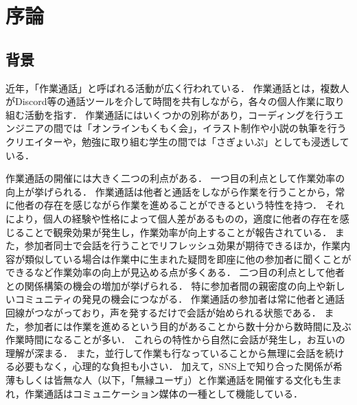 \chapter{序論\label{sec:introduction}}
\thispagestyle{plain}

\section{背景}

近年，「作業通話」と呼ばれる活動が広く行われている．
作業通話とは，複数人がDiscord\cite{Discord}等の通話ツールを介して時間を共有しながら，各々の個人作業に取り組む活動を指す．
作業通話にはいくつかの別称があり，コーディングを行うエンジニアの間では「オンラインもくもく会」，イラスト制作や小説の執筆を行うクリエイターや，勉強に取り組む学生の間では「さぎょいぷ」としても浸透している．

作業通話の開催には大きく二つの利点がある．
一つ目の利点として作業効率の向上が挙げられる．
作業通話は他者と通話をしながら作業を行うことから，常に他者の存在を感じながら作業を進めることができるという特性を持つ．
それにより，個人の経験や性格によって個人差があるものの，適度に他者の存在を感じることで観衆効果が発生し，作業効率が向上することが報告されている\cite{Zajonc}\cite{Matsumoto}\cite{Miyamoto}．
また，参加者同士で会話を行うことでリフレッシュ効果が期待できるほか，作業内容が類似している場合は作業中に生まれた疑問を即座に他の参加者に聞くことができるなど作業効率の向上が見込める点が多くある．
二つ目の利点として他者との関係構築の機会の増加が挙げられる．
特に参加者間の親密度の向上や新しいコミュニティの発見の機会につながる．
作業通話の参加者は常に他者と通話回線がつながっており，声を発するだけで会話が始められる状態である．
また，参加者には作業を進めるという目的があることから数十分から数時間に及ぶ作業時間になることが多い．
これらの特性から自然に会話が発生し，お互いの理解が深まる．
また，並行して作業も行なっていることから無理に会話を続ける必要もなく，心理的な負担も小さい．
加えて，SNS上で知り合った関係が希薄もしくは皆無な人（以下，「無縁ユーザ」）と作業通話を開催する文化も生まれ，作業通話はコミュニケーション媒体の一種として機能している．

